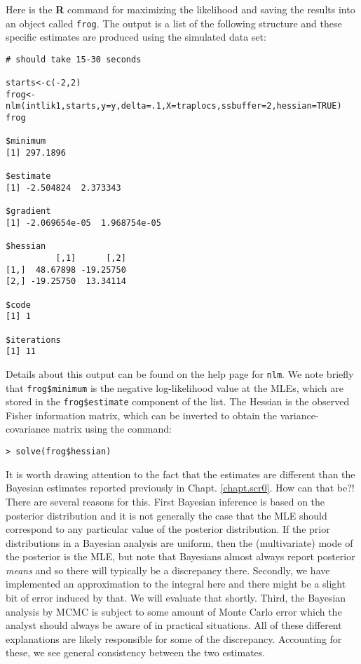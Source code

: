 Here is the {\bf R} command for maximizing the likelihood and saving the
results into an object called \mbox{\tt frog}.  The output is a list of the
following structure and these specific estimates are produced using
the simulated data set:

{\small 
\begin{verbatim}
# should take 15-30 seconds

starts<-c(-2,2)
frog<-nlm(intlik1,starts,y=y,delta=.1,X=traplocs,ssbuffer=2,hessian=TRUE)
frog

$minimum
[1] 297.1896

$estimate
[1] -2.504824  2.373343

$gradient
[1] -2.069654e-05  1.968754e-05

$hessian
          [,1]      [,2]
[1,]  48.67898 -19.25750
[2,] -19.25750  13.34114

$code
[1] 1

$iterations
[1] 11
\end{verbatim}
} 
Details about this output can be found on the help page for
\mbox{\tt nlm}. We note briefly that \mbox{\tt frog\$minimum} is the
negative log-likelihood value at the MLEs, which are stored in the
\mbox{\tt frog\$estimate} component of the list. The Hessian is the
observed Fisher information matrix, which can be inverted to obtain
the variance-covariance matrix using the command:
\begin{verbatim}
> solve(frog$hessian)
\end{verbatim}

It is worth drawing attention to the fact that the estimates are
different than the Bayesian estimates reported previously in Chapt. \ref{chapt.scr0}.
How can that be?!  There are several reasons for
this.  First Bayesian inference is based on the posterior distribution
and it is not generally the case that the MLE should correspond to any
particular value of the posterior distribution. If the prior
distributions in a Bayesian analysis are uniform, then the
(multivariate) mode of the
posterior is the MLE, but note that Bayesians almost always report
posterior {\it means} and so there will typically be a discrepancy
there. Secondly, we have implemented an approximation to the integral
here and there might be a slight bit of error induced by that. We will
evaluate that shortly. Third, the Bayesian analysis by MCMC is subject
to some amount of Monte Carlo error which the analyst should always be
aware of in practical situations.  All of these different explanations
are likely responsible for some of the discrepancy. Accounting for
these, we see general consistency between the
two estimates.


